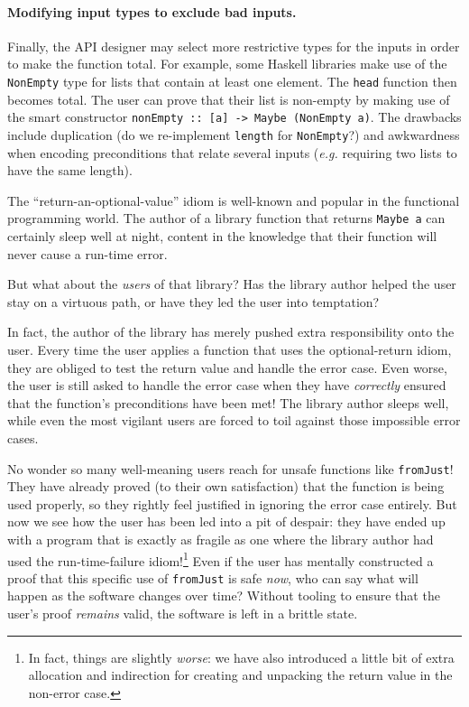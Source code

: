 \documentclass[format=sigplan, review=false, screen=true, 10pt]{acmart}
\makeatletter
\let\origsubsection\subsection
\renewcommand\subsection{\@ifstar{\starsubsection}{\nostarsubsection}}
\newcommand\nostarsubsection[1]
{\subsectionprelude\origsubsection{#1}\subsectionpostlude}
\newcommand\starsubsection[1]
{\subsectionprelude\origsubsection*{#1}\subsectionpostlude}
\newcommand\subsectionprelude{%
  \vspace{-0.25em}
}
\newcommand\subsectionpostlude{%
  \vspace{-0.05em}
}
\makeatother
\begin{document}
\paragraph{Modifying input types to exclude bad inputs.}
Finally, the API designer may select more restrictive types for the inputs in order
to make the function total. For example, some Haskell libraries make use of the
\texttt{NonEmpty} type for lists that contain at least one element. The \texttt{head}
function then becomes total. The user 
can prove that their list is non-empty by making use of the smart constructor
\texttt{nonEmpty :: [a] -> Maybe (NonEmpty a)}.
The drawbacks include duplication
(do we re-implement \texttt{length} for \texttt{NonEmpty}?)
and awkwardness when encoding preconditions that relate
several inputs (\textit{e.g.} requiring two lists to have the same length).

\subsection{Leading the User into Temptation}
The ``return-an-optional-value'' idiom is well-known and popular in the functional
programming world. The author of a library function that returns \texttt{Maybe a}
can certainly sleep well at night, content in the knowledge that their function
will never cause a run-time error.

But what about the \emph{users} of that library? Has the library author helped the user stay
on a virtuous path, or have they led the user into temptation?

In fact, the author of the library has merely pushed extra responsibility onto the user.
Every time the user applies a function that uses the optional-return idiom, they are obliged
to test the return value and handle the error case. Even worse, the user is still asked
to handle the error case when they have \emph{correctly} ensured that the function's
preconditions have been met! The library author sleeps well, while even the most vigilant
users are forced to toil against those impossible error cases.

No wonder so many well-meaning users reach for unsafe functions like \texttt{fromJust}!
They have already proved (to their own satisfaction) that the function is being used properly, so they rightly
feel justified in ignoring the error case entirely. But now we see how the user has been led into
a pit of despair: they have ended up with a program that is exactly as fragile as one where the library
author had used the run-time-failure idiom!\footnote{In fact, things are slightly \emph{worse}: we have also introduced a little
bit of extra allocation and indirection for creating and unpacking the return value in the non-error case.}
Even if the user has mentally constructed a proof that this specific use of \texttt{fromJust} is safe \emph{now},
who can say what will
happen as the software changes over time? Without tooling to ensure that the user's proof \emph{remains} valid,
the software is left in a brittle state.
\end{document}
